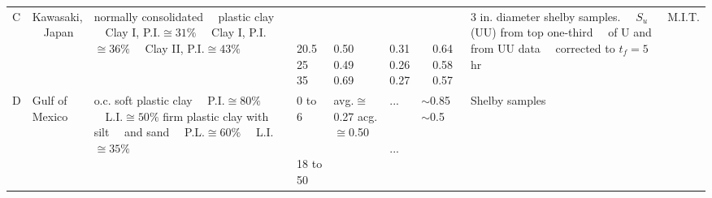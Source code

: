 \begin{table}[!htb]
\begin{threeparttable}[b]
{\begin{tabularx}{\textwidth}{lllllllll}
            C & \makecell[tl]{Kawasaki, \\~~Japan}                     & \makecell[tl]{normally consolidated \\~~plastic clay \\~~Clay I, P.I.\tnote{c}$\cong{}31\%$\\~~Clay I, P.I. $\cong{}36\%$\\~~Clay II, P.I.$\cong{}43\%$} & \makecell[tl]{\\\\20.5\\25\\35} & \makecell[tl]{\\\\0.50\\0.49\\0.69} & \makecell[tl]{\\\\0.31\\0.26\\0.27} & \makecell[tl]{\\\\~~0.64\\~~0.58\\~~0.57} & \makecell[tl]{3 in. diameter shelby samples.\\~~$S_u$(UU) from top one-third \\~~of U and from UU data \\~~corrected to $t_f=5$ hr} & M.I.T. \\
            D & \makecell[tl]{Gulf of \\Mexico}                          & \makecell[tl]{o.c. soft plastic clay\\~~P.I.$\cong{}80\%$\\~~L.I.$\cong{}50\%$\\firm plastic clay with silt \\~~and sand\\~~P.L.$\cong{}60\%$\\~~L.I.$\cong{}35\%$} & \makecell[tl]{0 to 6 \\\\\\18 to 50} & \makecell[tl]{avg.$\cong{}$0.27\\\\\\acg.$\cong{}$0.50} & \makecell[tl]{...\\\\\\...} & \makecell[tl]{$\sim{}$0.85\\\\\\$\sim{}$0.5} & Shelby samples & \citet{Fenske195616} \\

\end{tabularx}}
\end{threeparttable}
\end{table}
